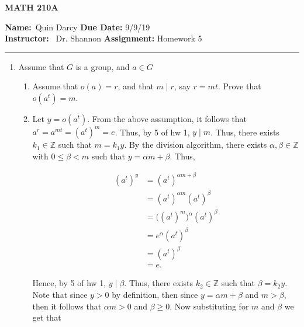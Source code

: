 \documentclass[12pt]{article}
\makeatletter
\theoremstyle{definition}
\theoremstyle{remark}
\renewenvironment{proof}[1][\proofname]{\par
  \pushQED{\qed}%
  \normalfont \topsep6\p@\@plus6\p@\relax
  \list{}{\leftmargin=0mm
          \rightmargin=4mm
          \settowidth{\itemindent}{\itshape#1}%
          \labelwidth=\itemindent
          \parsep=0pt \listparindent=\parindent 
  }
  \item[\hskip\labelsep
        \itshape
    #1\@addpunct{.}]\ignorespaces
}{%
  \popQED\endlist\@endpefalse
}
\let\oldproofname=\proofname
\renewcommand{\proofname}{\bf{\textit{\oldproofname}}}
\makeatother
\begin{document}
\begin{center}
	\vspace{.4cm} {\textbf { \large MATH 210A}}
\end{center}
{\textbf{Name:}\ Quin Darcy \hspace{\fill} \textbf{Due Date:} 9/9/19   \\
{ \textbf{Instructor:}} \ Dr. Shannon \hspace{\fill} \textbf{Assignment:} Homework 5 \\ \hrule}

\justifying

\begin{enumerate}[leftmargin=*]
    \item Assume that $G$ is a group, and $a\in G$\hfill\par
        \begin{enumerate}[label=(\alph*)]
            \item Assume that $o(a)=r$, and that $m\mid r$, say $r=mt$. Prove that $o(a^t)=m$.
                \begin{proof}
                    Let $y=o(a^t)$. From the above assumption, it follows that $a^r=a^{mt}=(a^t)^m=e$. Thus, by 5 of hw 1, $y\mid m$. Thus, there exists $k_1\in\mathbb{Z}$ such that $m=k_1y$. By the division algorithm, there exists $\alpha,\beta\in\mathbb{Z}$ with $0\leq \beta<m$ such that $y=\alpha m+\beta$. Thus,
                    
                    \begin{equation*}
                        \begin{split}
                            (a^t)^y &= (a^t)^{\alpha m+\beta} \\
                            &= (a^t)^{\alpha m}(a^t)^{\beta} \\
                            &= \big((a^t)^m\big)^{\alpha}(a^t)^{\beta} \\
                            &= e^{\alpha}(a^t)^{\beta} \\
                            &= (a^t)^{\beta} \\
                            &= e.
                        \end{split}
                    \end{equation*}
                    
                    Hence, by 5 of hw 1, $y\mid \beta$. Thus, there exists $k_2\in\mathbb{Z}$ such that $\beta=k_2 y$. Note that since $y>0$ by definition, then since $y=\alpha m+\beta$ and $m>\beta$, then it follows that $\alpha m>0$ and $\beta\geq 0$. Now substituting for $m$ and $\beta$ we get that 
                    

\end{proof}
\end{enumerate}
\end{enumerate}
\end{document}
